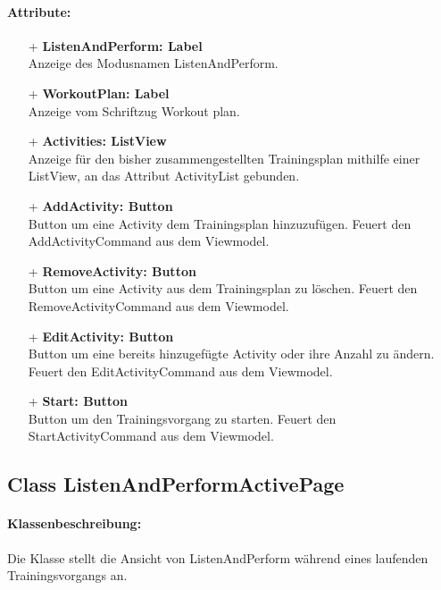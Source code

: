 \documentclass[a4paper,12pt]{article}
\begin{document}
\paragraph{Attribute:}
	\begin{itemize}
	\item[+] \textbf{ListenAndPerform: Label} \\ Anzeige des Modusnamen ListenAndPerform.
	\item[+] \textbf{WorkoutPlan: Label} \\ Anzeige vom Schriftzug Workout plan.
	\item[+] \textbf{Activities: ListView} \\	Anzeige für den bisher zusammengestellten Trainingsplan mithilfe einer ListView, an das Attribut ActivityList gebunden. 
	\item[+] \textbf{AddActivity: Button} \\ Button um eine Activity dem Trainingsplan hinzuzufügen. Feuert den AddActivityCommand aus dem Viewmodel.
	\item[+] \textbf{RemoveActivity: Button} \\ Button um eine Activity aus dem Trainingsplan zu löschen. Feuert den RemoveActivityCommand aus dem Viewmodel.
	\item[+] \textbf{EditActivity: Button} \\ Button um eine bereits hinzugefügte Activity oder ihre Anzahl zu ändern. Feuert den EditActivityCommand aus dem Viewmodel.
	\item[+] \textbf{Start: Button} \\ Button um den Trainingsvorgang zu starten. Feuert den StartActivityCommand aus dem Viewmodel.
	\end{itemize}

\subsection{Class ListenAndPerformActivePage}
\paragraph{Klassenbeschreibung:}
Die Klasse stellt die Ansicht von ListenAndPerform während eines laufenden Trainingsvorgangs an.
\end{document}
